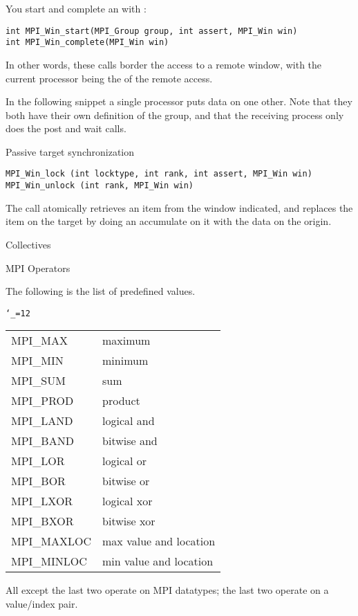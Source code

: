 You start and complete an  with%
:
\begin{verbatim}
int MPI_Win_start(MPI_Group group, int assert, MPI_Win win)
int MPI_Win_complete(MPI_Win win)
\end{verbatim}
In other words, these calls border the access to a remote window, with the current processor
being the  of the remote access.

In the following snippet a single processor puts data on one
other. Note that they both have their own definition of the group, and
that the receiving process only does the post and wait calls.

 {Passive target synchronization}

\begin{verbatim}
MPI_Win_lock (int locktype, int rank, int assert, MPI_Win win)
MPI_Win_unlock (int rank, MPI_Win win)
\end{verbatim}

The  call atomically retrieves an item from the window
indicated, and replaces the item on the target by doing an accumulate on it
with the data on the origin.
%

 {Collectives}

 {MPI Operators}

The following is the list of predefined  values.

\begingroup \tt\catcode`\_=12\relax
\begin{tabular}{ll}
  MPI_MAX&maximum\\
  MPI_MIN&minimum\\
  MPI_SUM&sum\\
  MPI_PROD&product\\
  MPI_LAND&logical and\\
  MPI_BAND&bitwise and\\
  MPI_LOR&logical or\\
  MPI_BOR&bitwise or\\
  MPI_LXOR&logical xor\\
  MPI_BXOR&bitwise xor\\
  MPI_MAXLOC&max value and location\\
  MPI_MINLOC&min value and location\\
\end{tabular}
\endgroup
All except the last two operate on MPI datatypes;
the last two operate on a value/index pair.

